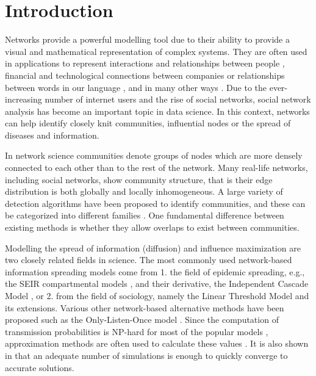 \documentclass[pdflatex,sn-mathphys-ay]{sn-jnl}
\begin{document}


\maketitle

\newpage


\section{Introduction}\label{sec_introduction}

Networks provide a powerful modelling tool due to their ability to provide a visual and mathematical representation of complex systems. They are often used in applications to represent interactions and relationships between people \citep{social}, financial and technological connections between companies \citep{fraud} or relationships between words in our language \citep{words}, and in many other ways \citep{newmanreview}. Due to the ever-increasing number of internet users and the rise of social networks, social network analysis has become an important topic in data science. In this context, networks can help identify closely knit communities, influential nodes or the spread of diseases and information.

In network science communities denote groups of nodes which are more densely connected to each other than to the rest of the network. Many real-life networks, including social networks, show community structure, that is their edge distribution is both globally and locally inhomogeneous. A large variety of detection algorithms have been proposed to identify communities, and these can be categorized into different families \citep{fortunatoreview}. One fundamental difference between existing methods is whether they allow overlaps to exist between communities.

Modelling the spread of information (diffusion) and influence maximization are two closely related fields in science. The most commonly used network-based information spreading models come from 1. the field of epidemic spreading, e.g., the SEIR compartmental models \citep{seir1927, seir2001}, and their derivative, the Independent Cascade Model \citep{domingos, kempe}, or 2. from the field of sociology, namely the Linear Threshold Model \citep{granovetter, kempe} and its extensions. Various other network-based alternative methods have been proposed such as the Only-Listen-Once model \citep{kempe}. Since the computation of transmission probabilities is NP-hard for most of the popular models \citep{kempe, economic}, approximation methods are often used to calculate these values \citep{lisurvey}. It is also shown in \citep{kempe, wasserman} that an adequate number of simulations is enough to quickly converge to accurate solutions.
\end{document}
